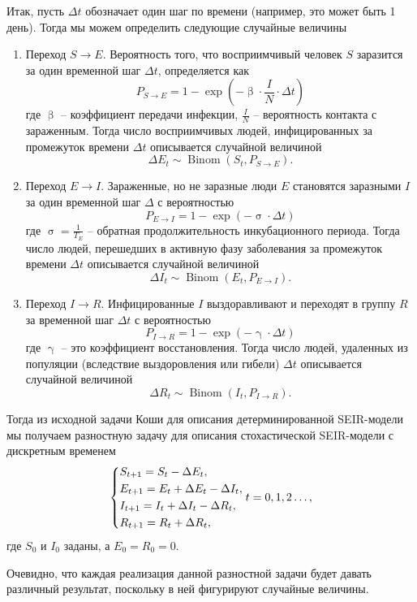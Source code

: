 \documentclass[a4paper, 14pt]{extreport}
\numberwithin{equation}{section}
\renewcommand{\beta}{\upbeta}
\renewcommand{\gamma}{\upgamma}
\renewcommand{\sigma}{\upsigma}
\newcommand{\Binom}{\operatorname{Binom}}
\begin{document}
	Итак, пусть $\Delta t$ обозначает один шаг по времени (например, это может быть 1 день). Тогда мы можем определить следующие случайные величины
	\begin{enumerate}
		\item Переход $S \to E$. Вероятность того, что восприимчивый человек $S$ заразится за один временной шаг $\Delta t$, определяется как
		$$
		P_{S\to E} = 1 - \exp\left(-\beta\cdot  \frac{I}{N} \cdot \Delta t\right)
		$$
		где $\beta$ -- коэффициент передачи инфекции, $\frac{I}{N}$ -- вероятность контакта с зараженным. Тогда число восприимчивых людей, инфицированных за промежуток времени $\Delta t$ описывается случайной величиной
		$$\Delta E_t \sim \Binom(S_t, P_{S\to E}).$$
		\item Переход $E \to I$. Зараженные, но не заразные люди $E$ становятся заразными $I$ за один временной шаг $\Delta$ с вероятностью
		$$
		P_{E\to I} = 1 - \exp\left(-\sigma \cdot \Delta t\right)
		$$
		где $\sigma = \frac{1}{T_E}$ -- обратная продолжительность инкубационного периода. Тогда число людей, перешедших в активную фазу заболевания за промежуток времени
		$\Delta t$ описывается случайной величиной
		$$\Delta I_t \sim \Binom(E_t, P_{E\to I}).$$
		\item Переход $I \to R$. Инфицированные $I$ выздоравливают и переходят в группу $R$ за временной шаг $\Delta t$ с вероятностью
		$$
		P_{I\to R} = 1 - \exp\left(-\gamma \cdot \Delta t\right)
		$$
		где $\gamma$ -- это коэффициент восстановления. Тогда число людей, удаленных из популяции (вследствие выздоровления
		или гибели)
		$\Delta t$ описывается случайной величиной
		$$\Delta R_t \sim \Binom(I_t, P_{I\to R}).$$
	\end{enumerate}
	Тогда из исходной задачи Коши для описания детерминированной SEIR-модели мы получаем разностную задачу для описания стохастической SEIR-модели с дискретным временем
	\begin{equation}
		\begin{dcases}
			S_{t+1} = S_t - \Delta E_t,\\
			E_{t+1} = E_t +\Delta E_t - \Delta I_t,\\
			I_{t+1} = I_t + \Delta I_t - \Delta R_t,\\
			R_{t+1} = R_t + \Delta R_t,
		\end{dcases}
		t = 0,1,2\ldots,
	\end{equation}
	где $S_0$ и $I_0$ заданы, а $E_0 = R_0 = 0$.
	
	Очевидно, что каждая реализация данной разностной задачи будет давать различный результат, поскольку в ней фигурируют случайные величины. 
\end{document}
